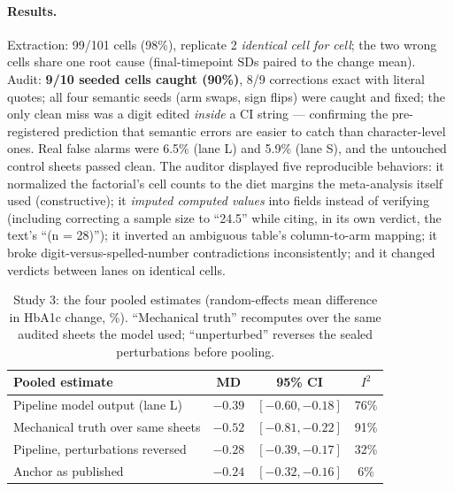 \documentclass[11pt]{article}
\begin{document}
\paragraph{Results.} Extraction: 99/101 cells (98\%), replicate 2 \emph{identical cell for cell}; the two wrong cells share one root cause (final-timepoint SDs paired to the change mean). Audit: \textbf{9/10 seeded cells caught (90\%)}, 8/9 corrections exact with literal quotes; all four semantic seeds (arm swaps, sign flips) were caught and fixed; the only clean miss was a digit edited \emph{inside} a CI string --- confirming the pre-registered prediction that semantic errors are easier to catch than character-level ones. Real false alarms were 6.5\% (lane L) and 5.9\% (lane S), and the untouched control sheets passed clean. The auditor displayed five reproducible behaviors: it normalized the factorial's cell counts to the diet margins the meta-analysis itself used (constructive); it \emph{imputed computed values} into fields instead of verifying (including correcting a sample size to ``24.5'' while citing, in its own verdict, the text's ``(n = 28)''); it inverted an ambiguous table's column-to-arm mapping; it broke digit-versus-spelled-number contradictions inconsistently; and it changed verdicts between lanes on identical cells.

\begin{table}[t]
\centering\small
\caption{Study 3: the four pooled estimates (random-effects mean difference in HbA1c change, \%). ``Mechanical truth'' recomputes over the same audited sheets the model used; ``unperturbed'' reverses the sealed perturbations before pooling.}
\label{tab:diamonds}
\begin{tabular}{lccc}
\toprule
Pooled estimate & MD & 95\% CI & $I^2$ \\
\midrule
Pipeline model output (lane L)      & $-0.39$ & $[-0.60, -0.18]$ & 76\% \\
Mechanical truth over same sheets    & $-0.52$ & $[-0.81, -0.22]$ & 91\% \\
Pipeline, perturbations reversed     & $-0.28$ & $[-0.39, -0.17]$ & 32\% \\
Anchor as published \citep{khraise2026lowcarb} & $-0.24$ & $[-0.32, -0.16]$ & 6\% \\
\bottomrule
\end{tabular}
\end{table}
\end{document}
